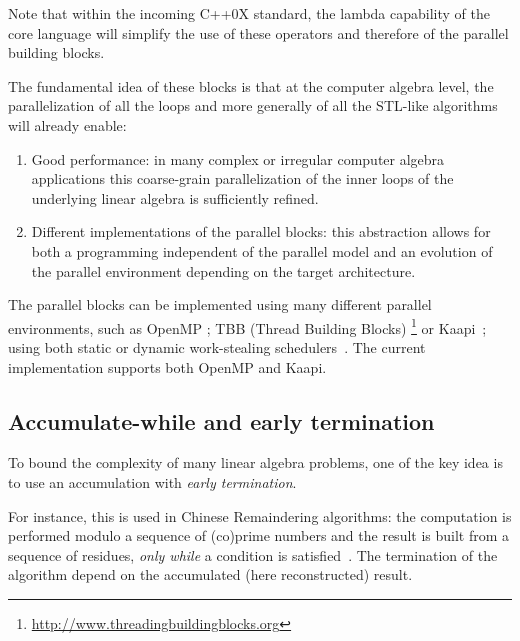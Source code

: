 \documentclass[runningheads,a4paper]{llncs}
\begin{document}
  Note that within the incoming C++0X standard, the lambda capability
  of the core language will simplify the use of these operators and
  therefore of the parallel
  building blocks.


  
  The fundamental idea of these blocks is that at the computer algebra
  level, the parallelization of all the loops and more generally of all
  the STL-like algorithms will already enable:
\begin{enumerate}
\item Good performance: in many complex or irregular computer algebra
  applications this coarse-grain parallelization of the inner loops of
  the underlying linear algebra is sufficiently refined.
\item Different implementations of the parallel blocks: this
  abstraction allows for both a programming independent of the
  parallel model and an evolution of the parallel environment
  depending on the target architecture.
\end{enumerate}

The parallel blocks can be implemented using many different parallel
environments, such as OpenMP
\cite{Chapman:2007:openmp}; TBB (Thread Building Blocks)
  \footnote{\url{http://www.threadingbuildingblocks.org}} or
  Kaapi~\cite{inproceedingsgautier.gbp_ktsrsf_07}; using
  both static or dynamic work-stealing
  schedulers~\cite{con-traore.trmgb_08}.
The current implementation supports both OpenMP and Kaapi.

\subsection{Accumulate-while and early termination}
To bound the complexity of many linear algebra problems, one of the
key idea is to use an accumulation with {\em early termination}.

For instance, this is used in Chinese Remaindering algorithms: the
computation is performed modulo a sequence of (co)prime numbers and
the result is built from a sequence of residues, {\em only while} a
condition is satisfied~\cite{jgd:2010:crt}. 
The termination of the algorithm depend on the accumulated (here
reconstructed) result.
  
\end{document}
